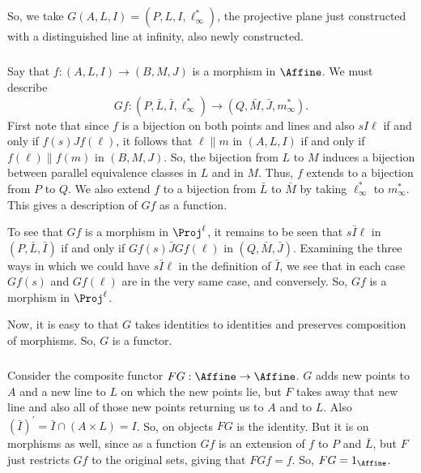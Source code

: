 \documentclass[main.tex]{subfiles}
\begin{document}
\subparagraph{}
So, we take $G(A,L,I)=(P,L,I,\ell^*_\infty)$, the projective plane just
constructed with a distinguished line at infinity, also newly constructed.

\subparagraph{}
Say that $f:(A,L,I)\rightarrow(B,M,J)$ is a morphism in $\Affine$. We must
describe
\[Gf:(P,\bar L,\bar I,\ell^*_\infty)\rightarrow(Q,\bar M,\bar J,m^*_\infty).\]
First note that since $f$ is a bijection on both points and lines and also
$sI\ell$ if and only  if $f(s)Jf(\ell)$, it follows that $\ell\parallel m$ in
$(A,L,I)$ if and only if $f(\ell)\parallel f(m)$ in $(B,M,J)$.  So, the
bijection from $L$ to $M$ induces a bijection between parallel equivalence
classes in $L$ and in $M$. Thus, $f$ extends to a bijection from $P$ to $Q$.  We
also extend $f$ to a bijection from $\bar L$ to $\bar M$ by taking
$\ell^*_\infty$ to $m^*_\infty$. This gives a description of $Gf$ as a function.

To see that $Gf$ is a morphism in $\Proj^\ell$, it remains to be seen that
$s\bar I\ell$ in $(P,\bar L,\bar I)$ if and only if $Gf(s)\bar JGf(\ell)$ in
$(Q,\bar M, \bar J)$. Examining the three ways in which we could have $s\bar
I\ell$ in the definition of $\bar I$, we see that in each case $Gf(s)$ and
$Gf(\ell)$ are in the very same case, and conversely. So, $Gf$ is a morphism in
$\Proj^\ell$.

Now, it is easy to that $G$ takes identities to identities and preserves
composition of morphisms. So, $G$ is a functor.

\subparagraph{}
Consider the composite functor $FG:\Affine\rightarrow\Affine$. $G$ adds new
points to $A$ and a new line to $L$ on which the new points lie, but $F$ takes
away that new line and also all of those new points returning  us to $A$ and to
$L$. Also $(\bar I)^\prime =\bar I\cap(A\times L)=I$. So,  on objects $FG$ is
the identity. But it is on morphisms as well, since as a function $Gf$ is an
extension of $f$ to $P$ and $\bar L$, but $F$ just restricts $Gf$ to the
original sets, giving that $FGf=f$. So, $FG=1_\Affine$.
\end{document}
